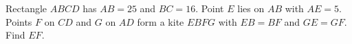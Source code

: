 Rectangle $ABCD$ has $AB=25$ and $BC=16$. Point $E$ lies on $AB$ with $AE=5$. Points $F$ on $CD$ and $G$ on $AD$ form a kite $EBFG$ with $EB=BF$ and $GE=GF$. Find $EF$.
